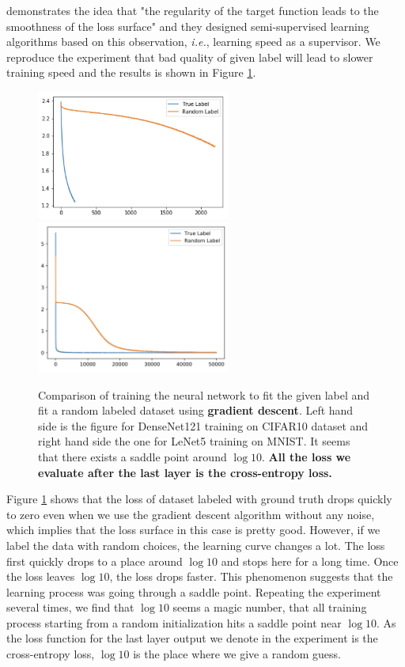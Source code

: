 \documentclass{article}
\theoremstyle{plain}
\theoremstyle{definition}
\begin{document}
\cite{cicek2018saas,cicek2018input} demonstrates the idea that "the regularity of the target function leads to the smoothness of the loss surface" and they designed semi-supervised learning algorithms based on this observation, \emph{i.e.}, learning speed as a supervisor. We reproduce the experiment that bad quality of given label will lead to slower training speed and the results is shown in Figure \ref{saas}.

\begin{figure}[htp]
	\centering
	\includegraphics[width=2.5in]{cifar.jpeg}
	\includegraphics[width=2.5in]{mnist.jpg}
	\caption{Comparison of training the neural network to fit the given label and fit a random labeled dataset using \textbf{gradient descent}. Left hand side is the figure for DenseNet121 training on CIFAR10 dataset and right hand side the one for LeNet5 training on MNIST. It seems that there exists a saddle point around $\log 10$. \textbf{All the loss we evaluate after the last layer is the cross-entropy loss.}}
	\label{saas}
\end{figure}

Figure \ref{saas} shows that the loss of dataset labeled with ground truth drops quickly to zero even when we use the gradient descent algorithm without any noise, which implies that the loss surface in this case is pretty good. However, if we label the data with random choices, the learning curve changes a lot. The loss first quickly drops to a place around $\log 10$ and stops here for a long time. Once the loss leaves $\log 10$, the loss drops faster. This phenomenon suggests that the learning process was going through a saddle point. Repeating the experiment several times, we find that $\log10$ seems a magic number, that all training process starting from a random initialization hits a saddle point near $\log 10$. As the loss function for the last layer output we denote in the experiment is the cross-entropy loss, $\log 10$ is the place where we give a random guess.
\end{document}
